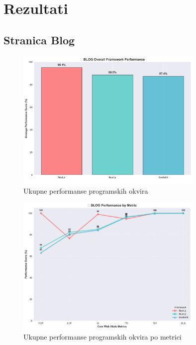 \section{Rezultati}

\subsection{Stranica Blog}

\begin{figure}[H]
    \centering
    \includegraphics[width=0.8\textwidth]{slike/rezultati/blog/blog_framework_overall_performance.png}
    \caption{Ukupne performanse programskih okvira}
    \label{fig:testiranje-blog-ukupne-performanse}
\end{figure}

\begin{figure}[H]
    \centering
    \includegraphics[width=0.8\textwidth]{slike/rezultati/blog/blog_performance_by_metric.png}
    \caption{Ukupne performanse programskih okvira po metrici}
    \label{fig:testiranje-blog-performanse-po-metrici}
\end{figure}

